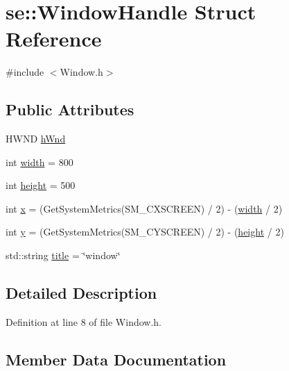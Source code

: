 \hypertarget{structse_1_1_window_handle}{}\section{se\+:\+:Window\+Handle Struct Reference}
\label{structse_1_1_window_handle}


{\ttfamily \#include $<$Window.\+h$>$}

\subsection*{Public Attributes}
\begin{DoxyCompactItemize}
\item 
H\+W\+ND \mbox{\hyperlink{structse_1_1_window_handle_a1466230e9f6cf80e20f6cb35bac7effe}{h\+Wnd}}
\item 
int \mbox{\hyperlink{structse_1_1_window_handle_a66814701369b6e581dcaa3d3ac468f5e}{width}} = 800
\item 
int \mbox{\hyperlink{structse_1_1_window_handle_a15729c4003be289e00604856310d988b}{height}} = 500
\item 
int \mbox{\hyperlink{structse_1_1_window_handle_a10cdc1524da4df60951578858b66901d}{x}} = (Get\+System\+Metrics(S\+M\+\_\+\+C\+X\+S\+C\+R\+E\+EN) / 2) -\/ (\mbox{\hyperlink{structse_1_1_window_handle_a66814701369b6e581dcaa3d3ac468f5e}{width}} / 2)
\item 
int \mbox{\hyperlink{structse_1_1_window_handle_a49c3cce4b0181f39e5b8443acee2083a}{y}} = (Get\+System\+Metrics(S\+M\+\_\+\+C\+Y\+S\+C\+R\+E\+EN) / 2) -\/ (\mbox{\hyperlink{structse_1_1_window_handle_a15729c4003be289e00604856310d988b}{height}} / 2)
\item 
std\+::string \mbox{\hyperlink{structse_1_1_window_handle_ab27997307c0b25e2736050727d393ca8}{title}} = \char`\"{}window\char`\"{}
\end{DoxyCompactItemize}


\subsection{Detailed Description}


Definition at line 8 of file Window.\+h.



\subsection{Member Data Documentation}
\mbox{\label{structse_1_1_window_handle_a15729c4003be289e00604856310d988b}} 
